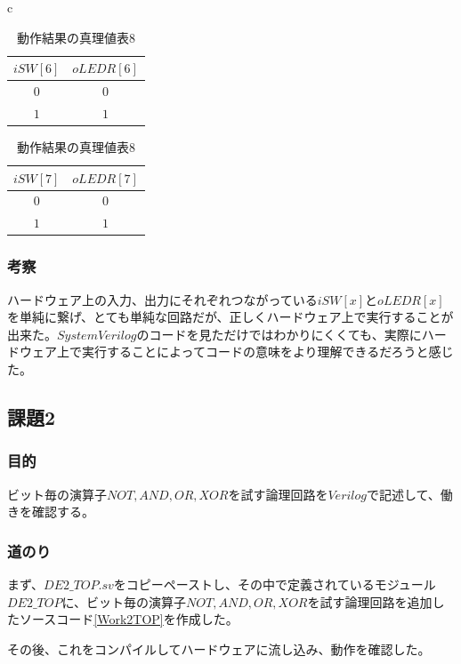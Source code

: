 \documentclass[a4paper]{jarticle}
\begin{document}
\begin{table}[!h]
	\begin{center}
		\begin{tabular}{c}
			\begin{minipage}{0.5\hsize}
				\begin{center}
					\caption{動作結果の真理値表7}
					\label{Work1TruthTable7}
					\begin{tabular}{|c|c|}
						\hline
						$iSW[6]$	&$oLEDR[6]$\\	\hline\hline
						$0$		&$0$\\		\hline
						$1$		&$1$\\		\hline
					\end{tabular}
				\end{center}
			\end{minipage}
			\begin{minipage}{0.5\hsize}
				\begin{center}
					\caption{動作結果の真理値表8}
					\label{Work2TruthTable8}
					\begin{tabular}{|c|c|}
						\hline
						$iSW[7]$	&$oLEDR[7]$\\	\hline\hline
						$0$		&$0$\\		\hline
						$1$		&$1$\\		\hline
					\end{tabular}
				\end{center}
			\end{minipage}
		\end{tabular}
	\end{center}
\end{table}
\subsubsection{考察}
ハードウェア上の入力、出力にそれぞれつながっている$iSW[x]$と$oLEDR[x]$を単純に繋げ、とても単純な回路だが、正しくハードウェア上で実行することが出来た。$System Verilog$のコードを見ただけではわかりにくくても、実際にハードウェア上で実行することによってコードの意味をより理解できるだろうと感じた。
\subsection{課題2}
\subsubsection{目的}
ビット毎の演算子$NOT,AND,OR,XOR$を試す論理回路を$Verilog$で記述して、働きを確認する。
\subsubsection{道のり}
まず、$DE2\_TOP.sv$をコピーペーストし、その中で定義されているモジュール$DE2\_TOP$に、ビット毎の演算子$NOT,AND,OR,XOR$を試す論理回路を追加したソースコード\ref{Work2TOP}を作成した。

その後、これをコンパイルしてハードウェアに流し込み、動作を確認した。
\end{document}
